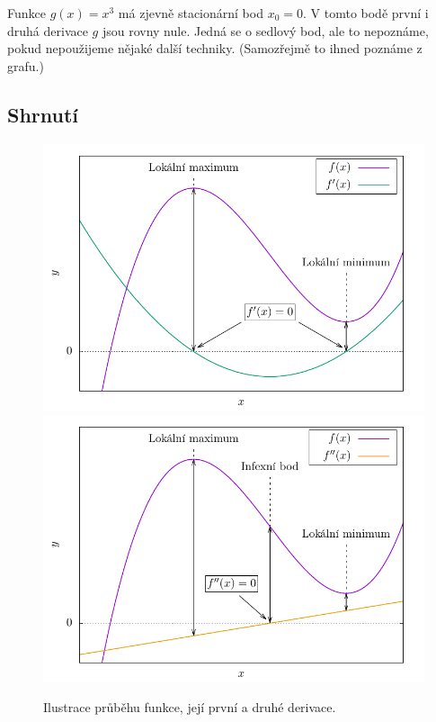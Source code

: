 \begin{example}
    Funkce $g(x)=x^3$ má zjevně stacionární bod $x_0 = 0$. V tomto bodě první i druhá derivace $g$ jsou rovny nule. Jedná se o sedlový bod, ale to  nepoznáme, pokud nepoužijeme nějaké další techniky. (Samozřejmě to ihned poznáme z grafu.)
\end{example}

\subsection{Shrnutí}

\begin{figure}[H]
    \centering
    \includegraphics[scale = 0.7]{Gnuplot/Figures/funkce-derivace.pdf}
    \includegraphics[scale = 0.7]{Gnuplot/Figures/funkce-druha-derivace.pdf}
    \caption{Ilustrace průběhu funkce, její první a druhé derivace.}
\end{figure}
